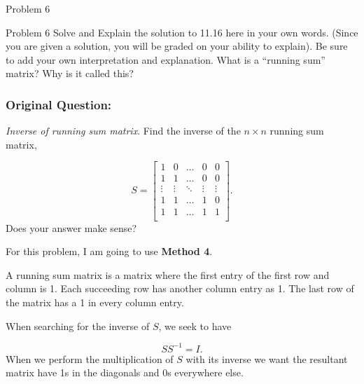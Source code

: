 \begin{problem}{Problem 6}
    \begin{statement}{Problem 6}
        Solve and Explain the solution to 11.16 here in your own words. (Since you are given a solution, you will be graded on your ability to explain). Be sure to add your own interpretation and 
        explanation. What is a “running sum” matrix? Why is it called this?

        \subsubsection*{Original Question:}

        \textit{Inverse of running sum matrix}. Find the inverse of the $n \times n$ running sum matrix,

        \begin{equation*}
            S = 
            \begin{bmatrix}
                1 & 0 & \dots & 0 & 0 \\
                1 & 1 & \dots & 0 & 0 \\
                \vdots & \vdots & \ddots & \vdots & \vdots \\
                1 & 1 & \dots & 1 & 0 \\
                1 & 1 & \dots & 1 & 1 \\
            \end{bmatrix}.
        \end{equation*}
        Does your answer make sense?
    \end{statement}

    \begin{Highlight}[Solution]
        \noindent For this problem, I am going to use \textbf{Method 4}. \vspace*{1em}

        A running sum matrix is a matrix where the first entry of the first row and column is 1. Each succeeding row has another column entry as 1. The last row of the matrix has a 1 in every column entry.

        When searching for the inverse of $S$, we seek to have 

        \setcounter{equation}{0}
        \begin{equation}
            SS^{-1} = I.
        \end{equation}
        When we perform the multiplication of $S$ with its inverse we want the resultant matrix have 1s in the diagonals and 0s everywhere else.


\end{Highlight}
\end{problem}
